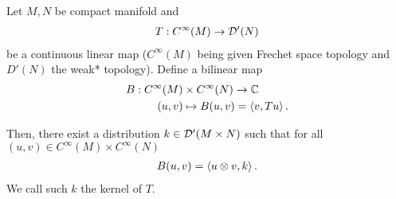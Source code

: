 \documentclass{article}
\begin{document}
\begin{ftheorem} 
    Let $M, N$ be compact manifold and 
    \begin{align*}
    T: C^\infty(M) \to \D'(N) \\
    \end{align*}
    be a continuous linear map ($C^\infty(M)$ being given Frechet space topology and $D'(N)$ the weak* topology). Define a bilinear map 
    \begin{align*}
    B: C^\infty(M) &\times C^\infty(N) \to \C \\
    (u, v) &\mapsto B(u, v) = \inprod[v, Tu]. 
    \end{align*}
    
    Then, there exist a distribution $k \in \D'(M \times N)$ such that for all $(u, v) \in C^\infty(M) \times C^\infty(N)$
    \begin{align*}
    B(u, v) = \inprod[u \otimes v, k]. 
    \end{align*}
    We call such $k$ the kernel of $T$. 
\end{ftheorem}

\begin{fdefinition}
    
    
\end{fdefinition}
%

\end{document}
